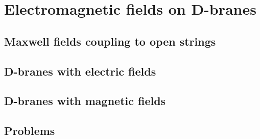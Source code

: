 \documentclass[12pt]{report}
\begin{document}
\chapter{Electromagnetic fields on D-branes}
\newpage
\section{Maxwell fields coupling to open strings}
\section{D-branes with electric fields}
\section{D-branes with magnetic fields}
\section{Problems}
\end{document}
